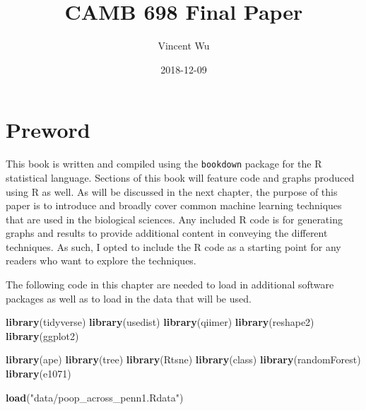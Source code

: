 \documentclass[12pt,openany]{book}
\title{CAMB 698 Final Paper}
\author{Vincent Wu}
\date{2018-12-09}
\newenvironment{Shaded}{\begin{snugshade}}{\end{snugshade}}
\newcommand{\KeywordTok}[1]{\textcolor[rgb]{0.13,0.29,0.53}{\textbf{#1}}}
\newcommand{\StringTok}[1]{\textcolor[rgb]{0.31,0.60,0.02}{#1}}
\newcommand{\NormalTok}[1]{#1}
\begin{document}
\maketitle

{
\setcounter{tocdepth}{1}
\tableofcontents
}
\chapter{Preword}\label{preword}

This book is written and compiled using the \texttt{bookdown} package
for the R statistical language. Sections of this book will feature code
and graphs produced using R as well. As will be discussed in the next
chapter, the purpose of this paper is to introduce and broadly cover
common machine learning techniques that are used in the biological
sciences. Any included R code is for generating graphs and results to
provide additional content in conveying the different techniques. As
such, I opted to include the R code as a starting point for any readers
who want to explore the techniques.

The following code in this chapter are needed to load in additional
software packages as well as to load in the data that will be used.

\begin{Shaded}
\begin{Highlighting}[]
\KeywordTok{library}\NormalTok{(tidyverse)}
\KeywordTok{library}\NormalTok{(usedist)}
\KeywordTok{library}\NormalTok{(qiimer)}
\KeywordTok{library}\NormalTok{(reshape2)}
\KeywordTok{library}\NormalTok{(ggplot2)}

\KeywordTok{library}\NormalTok{(ape)}
\KeywordTok{library}\NormalTok{(tree)}
\KeywordTok{library}\NormalTok{(Rtsne)}
\KeywordTok{library}\NormalTok{(class)}
\KeywordTok{library}\NormalTok{(randomForest)}
\KeywordTok{library}\NormalTok{(e1071)}
\end{Highlighting}
\end{Shaded}

\begin{Shaded}
\begin{Highlighting}[]
\KeywordTok{load}\NormalTok{(}\StringTok{"data/poop_across_penn1.Rdata"}\NormalTok{)}
\end{Highlighting}
\end{Shaded}
\end{document}
